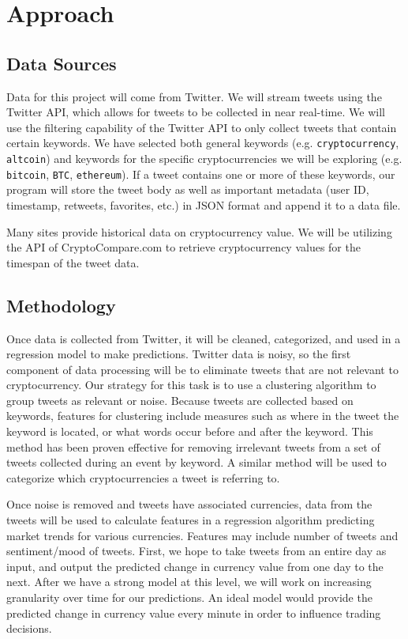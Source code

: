 \documentclass[sigconf]{acmart}
\newcommand{\code}{\texttt}
\begin{document}
\section{Approach}

\subsection{Data Sources}
Data for this project will come from Twitter. We will stream tweets using the Twitter API, which allows for tweets to be collected in near real-time. We will use the filtering capability of the Twitter API to only collect tweets that contain certain keywords. We have selected both general keywords (e.g. \code{cryptocurrency}, \code{altcoin}) and keywords for the specific cryptocurrencies we will be exploring (e.g. \code{bitcoin}, \code{BTC}, \code{ethereum}). If a tweet contains one or more of these keywords, our program will store the tweet body as well as important metadata (user ID, timestamp, retweets, favorites, etc.) in JSON format and append it to a data file.

Many sites provide historical data on cryptocurrency value. We will be utilizing the API of CryptoCompare.com to retrieve cryptocurrency values for the timespan of the tweet data.

\subsection{Methodology}
Once data is collected from Twitter, it will be cleaned, categorized, and used in a regression model to make predictions. Twitter data is noisy, so the first component of data processing will be to eliminate tweets that are not relevant to cryptocurrency. Our strategy for this task is to use a clustering algorithm to group tweets as relevant or noise. Because tweets are collected based on keywords, features for clustering include measures such as where in the tweet the keyword is located, or what words occur before and after the keyword. This method has been proven effective for removing irrelevant tweets from a set of tweets collected during an event by keyword\cite{sakai}. A similar method will be used to categorize which cryptocurrencies a tweet is referring to.

Once noise is removed and tweets have associated currencies, data from the tweets will be used to calculate features in a regression algorithm predicting market trends for various currencies. Features may include number of tweets and sentiment/mood of tweets. First, we hope to take tweets from an entire day as input, and output the predicted change in currency value from one day to the next. After we have a strong model at this level, we will work on increasing granularity over time for our predictions. An ideal model would provide the predicted change in currency value every minute in order to influence trading decisions.
\end{document}

